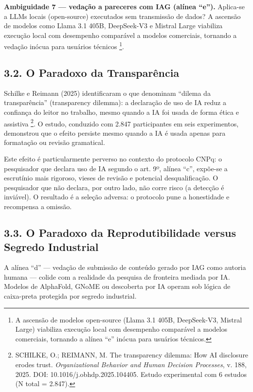 \documentclass[
  12pt,
  a4paper,
  brazil,
  twoside
]{report}
\begin{document}
\textbf{Ambiguidade 7 --- vedação a pareceres com IAG (alínea ``e'').}
Aplica-se a LLMs locais (open-source) executados sem transmissão de
dados? A ascensão de modelos como Llama 3.1 405B, DeepSeek-V3 e Mistral
Large viabiliza execução local com desempenho comparável a modelos
comerciais, tornando a vedação inócua para usuários técnicos
\footnote{A ascensão de modelos open-source (Llama 3.1 405B,
  DeepSeek-V3, Mistral Large) viabiliza execução local com desempenho
  comparável a modelos comerciais, tornando a alínea ``e'' inócua para
  usuários técnicos.}.

\subsection{3.2. O Paradoxo da
Transparência}\label{o-paradoxo-da-transparuxeancia}

Schilke e Reimann (2025) identificaram o que denominam ``dilema da
transparência'' (transparency dilemma): a declaração de uso de IA reduz
a confiança do leitor no trabalho, mesmo quando a IA foi usada de forma
ética e assistiva \footnote{SCHILKE, O.; REIMANN, M. The transparency
  dilemma: How AI disclosure erodes trust. \emph{Organizational Behavior
  and Human Decision Processes}, v. 188, 2025. DOI:
  10.1016/j.obhdp.2025.104405. Estudo experimental com 6 estudos (N
  total = 2.847).}. O estudo, conduzido com 2.847 participantes em seis
experimentos, demonstrou que o efeito persiste mesmo quando a IA é usada
apenas para formatação ou revisão gramatical.

Este efeito é particularmente perverso no contexto do protocolo CNPq: o
pesquisador que declara uso de IA segundo o art. 9º, alínea ``c'',
expõe-se a escrutínio mais rigoroso, vieses de revisão e potencial
desqualificação. O pesquisador que não declara, por outro lado, não
corre risco (a detecção é inviável). O resultado é a seleção adversa: o
protocolo pune a honestidade e recompensa a omissão.

\subsection{3.3. O Paradoxo da Reprodutibilidade versus Segredo
Industrial}\label{o-paradoxo-da-reprodutibilidade-versus-segredo-industrial}

A alínea ``d'' --- vedação de submissão de conteúdo gerado por IAG como
autoria humana --- colide com a realidade da pesquisa de fronteira
mediada por IA. Modelos de AlphaFold, GNoME ou descoberta por IA operam
sob lógica de caixa-preta protegida por segredo industrial.
\end{document}
